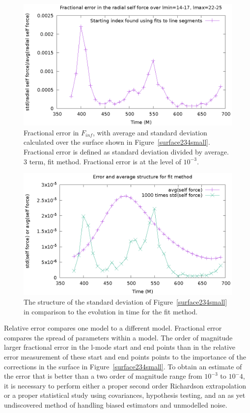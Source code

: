 \begin{figure}
  \includegraphics{fractionalErrorOverTimeFits}
  \caption{Fractional error in $F_{inf}$, with average and standard deviation calculated over the surface shown in Figure~\ref{surface234small}. Fractional error is defined as standard deviation divided by average. 3 term, fit method. Fractional error is at the level of $10^{-3}$.}
  \label{fitfracerr}
\end{figure}


\begin{figure}
  \includegraphics{structErrFitMethod}
  \caption{The structure of the standard deviation of Figure~\ref{surface234small} in comparison to the evolution in time for the fit method.}
  \label{twopeaks}
\end{figure}

Relative error compares one model to a different model. Fractional error compares the spread of parameters within a model. The order of magnitude larger fractional error in the l-mode start and end points than in the relative error measurement of these start and end points points to the importance of the corrections in the surface in Figure~\ref{surface234small}. To obtain an estimate of the error that is better than a two order of magnitude range from $10^{-3}$ to $10^-{4}$, it is necessary to perform either a proper second order Richardson extrapolation or a proper statistical study using covariances, hypothesis testing, and an as yet undiscovered method of handling biased estimators and unmodelled noise. 



